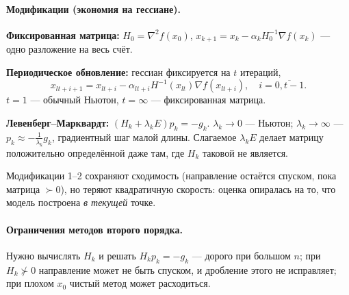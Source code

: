 \paragraph{Модификации (экономия на гессиане).}
\begin{csteps}
  \item \textbf{Фиксированная матрица:} $H_0 = \nabla^2 f(x_0)$,
        $x_{k+1} = x_k - \alpha_k H_0^{-1}\nabla f(x_k)$ — одно разложение на
        весь счёт.
  \item \textbf{Периодическое обновление:} гессиан фиксируется на $t$ итераций,
        \[
          x_{lt+i+1} = x_{lt+i} - \alpha_{lt+i}H^{-1}(x_{lt})\nabla f(x_{lt+i}),
          \quad i = \overline{0,t-1} .
        \]
        $t = 1$ — обычный Ньютон, $t = \infty$ — фиксированная матрица.
  \item \textbf{Левенберг--Марквардт:} $(H_k + \lambda_k E)p_k = -g_k$.
        $\lambda_k \to 0$ — Ньютон; $\lambda_k \to \infty$ —
        $p_k \approx -\frac{1}{\lambda_k}g_k$, градиентный шаг малой длины.
        Слагаемое $\lambda_k E$ делает матрицу положительно определённой даже
        там, где $H_k$ таковой не является.
\end{csteps}
Модификации 1--2 сохраняют сходимость (направление остаётся спуском, пока
матрица $\succ 0$), но теряют квадратичную скорость: оценка опиралась на то,
что модель построена \emph{в текущей} точке.

\paragraph{Ограничения методов второго порядка.}
Нужно вычислять $H_k$ и решать $H_k p_k = -g_k$ — дорого при большом $n$;
при $H_k \not\succ 0$ направление может не быть спуском, и дробление этого не
исправляет; при плохом $x_0$ чистый метод может расходиться.

